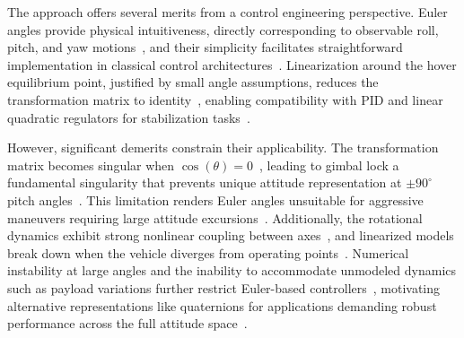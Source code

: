 The approach offers several merits from a control engineering perspective. Euler angles provide physical intuitiveness, directly corresponding to observable roll, pitch, and yaw motions~\cite{mokhtari2004dynamic}, and their simplicity facilitates straightforward implementation in classical control architectures~\cite{davidson2024reinforcement,jafar2016mathematical}. Linearization around the hover equilibrium point, justified by small angle assumptions, reduces the transformation matrix to identity~\cite{acosta2020real}, enabling compatibility with PID and linear quadratic regulators for stabilization tasks~\cite{shah2018gain,bushra2018design,jafar2016mathematical}. 

However, significant demerits constrain their applicability. The transformation matrix becomes singular when $\cos(\theta) = 0$~\cite{colmenares2015position,colmenares2015integral}, leading to gimbal lock a fundamental singularity that prevents unique attitude representation at $\pm 90^\circ$ pitch angles~\cite{alaimo2013comparison,abro2021performance}. This limitation renders Euler angles unsuitable for aggressive maneuvers requiring large attitude excursions~\cite{seshasayanan2022robust,alaimo2013comparison}. Additionally, the rotational dynamics exhibit strong nonlinear coupling between axes~\cite{hedjar2019robust,thanh2022quadcopter}, and linearized models break down when the vehicle diverges from operating points~\cite{thanh2022quadcopter}. Numerical instability at large angles and the inability to accommodate unmodeled dynamics such as payload variations further restrict Euler-based controllers~\cite{abro2021performance}, motivating alternative representations like quaternions for applications demanding robust performance across the full attitude space~\cite{alaimo2013comparison,abro2021performance}.





